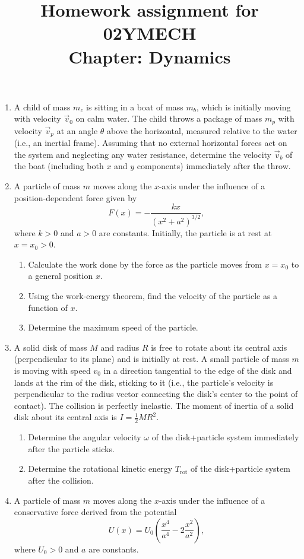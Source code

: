 \documentclass[../main.tex]{subfiles}
\title{Homework assignment for 02YMECH \\ Chapter: Dynamics}
\begin{document}
\date{}
\maketitle
\vspace{-0.8in}
\begin{enumerate}
    \item A child of mass $m_c$ is sitting in a boat of mass $m_b$, which is initially moving with velocity $\vec{v}_0$ on calm water. The child throws a package of mass $m_p$ with velocity $\vec{v}_p$ at an angle $\theta$ above the horizontal, measured relative to the water (i.e., an inertial frame). Assuming that no external horizontal forces act on the system and neglecting any water resistance, determine the velocity $\vec{v}_b$ of the boat (including both $x$ and $y$ components) immediately after the throw.
    \item A particle of mass $m$ moves along the $x$-axis under the influence of a position-dependent force given by
\[
F(x) = - \frac{k x}{(x^2 + a^2)^{3/2}},
\]
where $k>0$ and $a>0$ are constants. Initially, the particle is at rest at $x = x_0 > 0$. 

\begin{enumerate}
    \item Calculate the work done by the force as the particle moves from $x = x_0$ to a general position $x$. 
    \item Using the work-energy theorem, find the velocity of the particle as a function of $x$. 
    \item Determine the maximum speed of the particle. 
\end{enumerate}
    \item A solid disk of mass $M$ and radius $R$ is free to rotate about its central axis (perpendicular to its plane) and is initially at rest. A small particle of mass $m$ is moving with speed $v_0$ in a direction tangential to the edge of the disk and lands at the rim of the disk, sticking to it (i.e., the particle’s velocity is perpendicular to the radius vector connecting the disk’s center to the point of contact). The collision is perfectly inelastic. The moment of inertia of a solid disk about its central axis is $I = \frac{1}{2} M R^2$.
    \begin{enumerate}
        \item Determine the angular velocity $\omega$ of the disk+particle system immediately after the particle sticks.
        \item Determine the rotational kinetic energy $T_\text{rot}$ of the disk+particle system after the collision.
    \end{enumerate}
    \item A particle of mass $m$ moves along the $x$-axis under the influence of a conservative force derived from the potential
\[
U(x) = U_0 \left( \frac{x^4}{a^4} - 2 \frac{x^2}{a^2} \right),
\]
where $U_0 > 0$ and $a$ are constants.


\end{enumerate}
\end{document}
